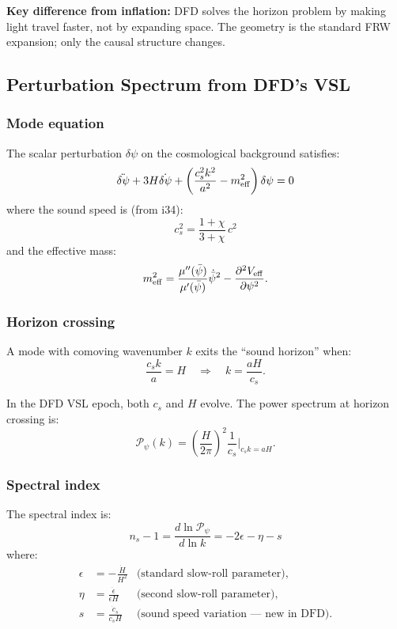 \documentclass[11pt,a4paper]{article}
\begin{document}
\textbf{Key difference from inflation:} DFD solves the horizon problem by making light travel faster, not by expanding space. The geometry is the standard FRW expansion; only the causal structure changes.

\subsection{Perturbation Spectrum from DFD's VSL}

\subsubsection{Mode equation}

The scalar perturbation $\delta\psi$ on the cosmological background satisfies:
\begin{equation}
\ddot{\delta\psi} + 3H\dot{\delta\psi} + \left(\frac{c_s^2 k^2}{a^2} - m_{\rm eff}^2\right)\delta\psi = 0
\end{equation}
where the sound speed is (from i34):
\begin{equation}
c_s^2 = \frac{1+\chi}{3+\chi}\,c^2
\end{equation}
and the effective mass:
\begin{equation}
m_{\rm eff}^2 = \frac{\mu''(\bar\psi)}{\mu'(\bar\psi)}\dot{\bar\psi}^2 - \frac{\partial^2 V_{\rm eff}}{\partial\psi^2}.
\end{equation}

\subsubsection{Horizon crossing}

A mode with comoving wavenumber $k$ exits the ``sound horizon'' when:
\begin{equation}
\frac{c_s k}{a} = H \quad \Rightarrow \quad k = \frac{aH}{c_s}.
\end{equation}

In the DFD VSL epoch, both $c_s$ and $H$ evolve. The power spectrum at horizon crossing is:
\begin{equation}
\mathcal{P}_\psi(k) = \left(\frac{H}{2\pi}\right)^2\frac{1}{c_s}\bigg|_{c_s k = aH}.
\end{equation}

\subsubsection{Spectral index}

The spectral index is:
\begin{equation}
n_s - 1 = \frac{d\ln\mathcal{P}_\psi}{d\ln k} = -2\epsilon - \eta - s
\end{equation}
where:
\begin{align}
\epsilon &= -\frac{\dot H}{H^2} & \text{(standard slow-roll parameter)}, \\
\eta &= \frac{\dot\epsilon}{\epsilon H} & \text{(second slow-roll parameter)}, \\
s &= \frac{\dot c_s}{c_s H} & \text{(sound speed variation --- new in DFD)}.
\end{align}
\end{document}
